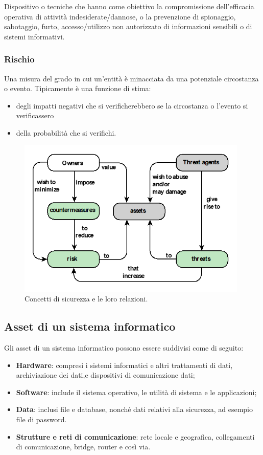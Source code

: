 Dispositivo o tecniche che hanno come obiettivo la compromissione dell'efficacia
operativa di attività indesiderate/dannose, o la prevenzione di spionaggio,
sabotaggio, furto, accesso/utilizzo non autorizzato di informazioni
sensibili o di sistemi informativi.

\subsubsection{Rischio}

Una misura del grado in cui un'entità è minacciata da una potenziale circostanza o
evento. Tipicamente è una funzione di stima:

\begin{itemize}
      \item degli impatti negativi che si verificherebbero se la circostanza o
            l'evento si verificassero
      \item della probabilità che si verifichi.
\end{itemize}

\begin{figure}[H]
      \centering
      \includegraphics[width=11cm, keepaspectratio]{capitoli/cap_1/imgs/relazione_concetti_sicurezza.png}
      \caption{Concetti di sicurezza e le loro relazioni.}\label{fig:relazioni_concetti_sec}
\end{figure}

\subsection{Asset di un sistema informatico}

Gli asset di un sistema informatico possono essere suddivisi come di seguito:
\begin{itemize}
      \item \textbf{Hardware}: compresi i sistemi informatici e altri trattamenti di dati, archiviazione dei dati,e dispositivi di comunicazione dati;
      \item \textbf{Software}: include il sistema operativo, le utilità di sistema e le applicazioni;
      \item \textbf{Data}: inclusi file e database, nonché dati relativi alla sicurezza, ad esempio file di password.
      \item \textbf{Strutture e reti di comunicazione}: rete locale e geografica, collegamenti di comunicazione, bridge, router e così via.
\end{itemize}

